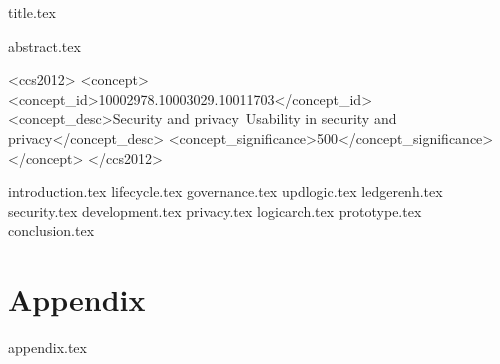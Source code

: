 \documentclass[sigconf, anonymous]{acmart}
\begin{document}
{title.tex}


{abstract.tex}



\begin{CCSXML}
<ccs2012>
<concept>
<concept_id>10002978.10003029.10011703</concept_id>
<concept_desc>Security and privacy~Usability in security and privacy</concept_desc>
<concept_significance>500</concept_significance>
</concept>
</ccs2012>
\end{CCSXML}





{introduction.tex}
{lifecycle.tex}
{governance.tex}
{updlogic.tex}
{ledgerenh.tex}
{security.tex}
{development.tex}
{privacy.tex}
{logicarch.tex}
{prototype.tex}
{conclusion.tex}


\ifshort\else
\appendix
\section*{Appendix}
{appendix.tex}
\fi



\end{document}
